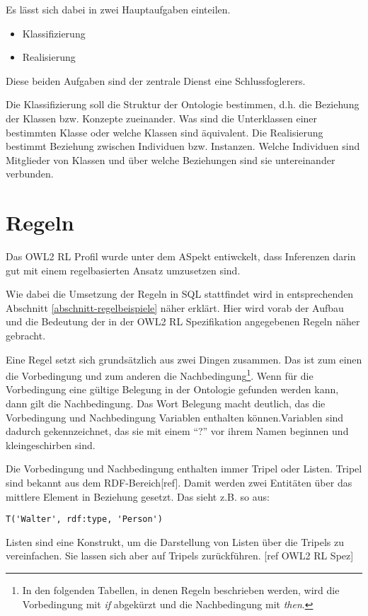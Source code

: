 Es lässt sich dabei in zwei Hauptaufgaben einteilen.
\begin{itemize}
  \item Klassifizierung
  \item Realisierung
\end{itemize}
Diese beiden Aufgaben sind der zentrale Dienst eine Schlussfoglerers. 

Die Klassifizierung soll die Struktur der Ontologie bestimmen, d.h. die Beziehung der Klassen bzw. Konzepte zueinander. Was sind die Unterklassen einer bestimmten Klasse oder welche Klassen sind äquivalent.
Die Realisierung bestimmt Beziehung zwischen Individuen bzw. Instanzen. Welche Individuen sind Mitglieder von Klassen und über welche Beziehungen sind sie untereinander verbunden.

\section{Regeln}
Das OWL2 RL Profil wurde unter dem ASpekt entiwckelt, dass Inferenzen darin gut mit einem regelbasierten Ansatz umzusetzen sind.

Wie dabei die Umsetzung der Regeln in SQL stattfindet wird in entsprechenden Abschnitt \ref{abschnitt-regelbeispiele} näher erklärt. Hier wird vorab der Aufbau und die Bedeutung der in der OWL2 RL Spezifikation angegebenen Regeln näher gebracht.

Eine Regel setzt sich grundsätzlich aus zwei Dingen zusammen. Das ist zum einen die Vorbedingung und zum anderen die Nachbedingung\footnote{In den folgenden Tabellen, in denen Regeln beschrieben werden, wird die Vorbedingung mit \emph{if} abgekürzt und die Nachbedingung mit \emph{then}.}. Wenn für die Vorbedingung eine gültige Belegung in der Ontologie gefunden werden kann, dann gilt die Nachbedingung. Das Wort Belegung macht deutlich, das die Vorbedingung und Nachbedingung Variablen enthalten können.Variablen sind dadurch gekennzeichnet, das sie mit einem ``?'' vor ihrem Namen beginnen und kleingeschirben sind.

Die Vorbedingung und Nachbedingung enthalten immer Tripel oder Listen. Tripel sind bekannt aus dem RDF-Bereich[ref]. Damit werden zwei Entitäten über das mittlere Element in Beziehung gesetzt. Das sieht z.B. so aus:
\begin{verbatim}
T('Walter', rdf:type, 'Person')
\end{verbatim}
Listen sind eine Konstrukt, um die Darstellung von Listen über die Tripels zu vereinfachen. Sie lassen sich aber auf Tripels zurückführen. [ref OWL2 RL Spez]

